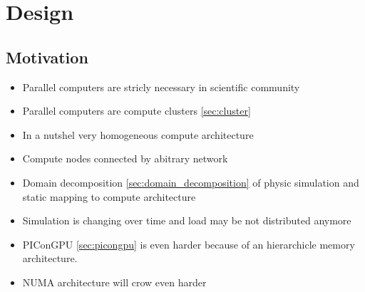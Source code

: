\chapter{Design}
\label{sec:design}



\section{Motivation}
\begin{itemize}
\item Parallel computers are stricly necessary in scientific community
\item Parallel computers are compute clusters \ref{sec:cluster}
\item In a nutshel very homogeneous compute architecture
\item Compute nodes connected by abitrary network
\item Domain decomposition \ref{sec:domain_decomposition} of physic
  simulation and static mapping to compute architecture
\item Simulation is changing over time and load may be not distributed
  anymore
\item PIConGPU \ref{sec:picongpu} is even harder because of an
  hierarchicle memory architecture.
\item NUMA architecture will crow even harder
\end{itemize}

